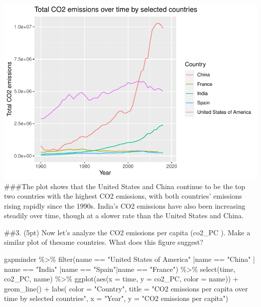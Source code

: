 \documentclass[
]{article}
\newenvironment{Shaded}{\begin{snugshade}}{\end{snugshade}}
\newcommand{\AttributeTok}[1]{\textcolor[rgb]{0.77,0.63,0.00}{#1}}
\newcommand{\FunctionTok}[1]{\textcolor[rgb]{0.00,0.00,0.00}{#1}}
\newcommand{\NormalTok}[1]{#1}
\newcommand{\SpecialCharTok}[1]{\textcolor[rgb]{0.00,0.00,0.00}{#1}}
\newcommand{\StringTok}[1]{\textcolor[rgb]{0.31,0.60,0.02}{#1}}
\begin{document}
\includegraphics{ps05-rmarkdown_files/figure-latex/unnamed-chunk-9-1.pdf}
\#\#\#The plot shows that the United States and China continue to be the
top two countries with the highest CO2 emissions, with both countries'
emissions rising rapidly since the 1990s. India's CO2 emissions have
also been increasing steadily over time, though at a slower rate than
the United States and China.

\#\#3. (5pt) Now let's analyze the CO2 emissions per capita (co2\_PC ).
Make a similar plot of thesame countries. What does this figure suggest?

\begin{Shaded}
\begin{Highlighting}[]
\NormalTok{gapminder }\SpecialCharTok{\%\textgreater{}\%}
  \FunctionTok{filter}\NormalTok{(name }\SpecialCharTok{==} \StringTok{"United States of America"} \SpecialCharTok{|}\NormalTok{name }\SpecialCharTok{==} \StringTok{"China"} \SpecialCharTok{|}\NormalTok{ name }\SpecialCharTok{==} \StringTok{"India"} \SpecialCharTok{|}\NormalTok{name }\SpecialCharTok{==} \StringTok{"Spain"}\SpecialCharTok{|}\NormalTok{name }\SpecialCharTok{==} \StringTok{"France"}\NormalTok{) }\SpecialCharTok{\%\textgreater{}\%}
  \FunctionTok{select}\NormalTok{(time, co2\_PC, name) }\SpecialCharTok{\%\textgreater{}\%}
  \FunctionTok{ggplot}\NormalTok{(}\FunctionTok{aes}\NormalTok{(}\AttributeTok{x =}\NormalTok{ time, }\AttributeTok{y =}\NormalTok{ co2\_PC, }\AttributeTok{color =}\NormalTok{ name)) }\SpecialCharTok{+}
  \FunctionTok{geom\_line}\NormalTok{() }\SpecialCharTok{+}
  \FunctionTok{labs}\NormalTok{( }\AttributeTok{color =} \StringTok{"Country"}\NormalTok{, }\AttributeTok{title =} \StringTok{"CO2 emissions per capita over time by selected countries"}\NormalTok{, }\AttributeTok{x =} \StringTok{"Year"}\NormalTok{, }\AttributeTok{y =} \StringTok{"CO2 emissions per capita"}\NormalTok{)}
\end{Highlighting}
\end{Shaded}
\end{document}
